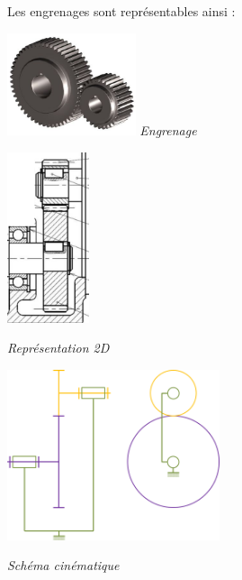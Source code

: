 \documentclass[10pt,oneside]{article}
\begin{document}
Les engrenages sont représentables ainsi :
\begin{center}
\begin{minipage}[c]{.2\linewidth}
\begin{center}
\includegraphics[height=3cm]{png/fig3}
\textit{Engrenage}
\end{center}
\end{minipage} \hfill
\begin{minipage}[c]{.3\linewidth}
\begin{center}
\includegraphics[height=5cm]{png/fig4}

\textit{Représentation 2D}
\end{center}
\end{minipage} \hfill
\begin{minipage}[c]{.3\linewidth}
\begin{center}
\includegraphics[height=5cm]{png/fig5}

\textit{Schéma cinématique}
\end{center}
\end{minipage} \hfill
\end{center}
\end{document}

